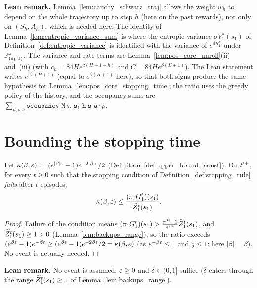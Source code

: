 \textbf{Lean remark.} Lemma~\ref{lem:cauchy_schwarz_traj} allows the weight $w_h$ to depend on
the whole trajectory up to step $h$ (here on the past rewards), not only on $(S_h, A_h)$, which
is needed here. The identity of Lemma~\ref{lem:entropic_variance_sum} is where the entropic
variance $\sigma V^\pi_1(s_1)$ of Definition~\ref{def:entropic_variance} is identified with the
variance of $e^{\beta R_1^\pi}$ under $\mathbb{P}^\pi_{(s_1,1)}$. The variance and rate terms are
Lemma~\ref{lem:pos_core_unroll}(ii) and~(iii) (with $c_h = 84He^{\beta(H+1-h)}$ and
$C = 84He^{\beta(H+1)}$). The Lean statement writes $e^{|\beta|(H+1)}$ (equal to $e^{\beta(H+1)}$ here), so
that both signs produce the same hypothesis for Lemma~\ref{lem:pos_core_stopping_time}; the
ratio uses the greedy policy of the history, and the occupancy sums are
$\sum_{h, s, a}\texttt{occupancy M π s₁ h s a} \cdot \rho$.

\section{Bounding the stopping time}
\label{sec:pos_stopping_time}

\begin{lemma}\label{lem:progress_pos}
\leanok
{}
Let $\kappa(\beta, \varepsilon) := (e^{|\beta|\varepsilon} - 1)e^{-2|\beta|\varepsilon}/2$ (Definition~\ref{def:upper_bound_const}).
On $\mathcal{E}^+$, for every $t \ge 0$ such that the stopping condition of Definition~\ref{def:stopping_rule}
\emph{fails} after $t$ episodes,
\[
  \kappa(\beta, \varepsilon) \le \frac{(\pi_1G_1^t)(s_1)}{\widetilde{Z}_1^t(s_1)} .
\]
\end{lemma}

\begin{proof}
\leanok
Failure of the condition means $(\pi_1G_1^t)(s_1) > \frac{e^{\beta\varepsilon} - 1}{e^{\beta\varepsilon}}\widetilde{Z}_1^t(s_1)$, and
$\widetilde{Z}_1^t(s_1) \ge 1 > 0$ (Lemma~\ref{lem:backups_range}), so the ratio exceeds
$(e^{\beta\varepsilon} - 1)e^{-\beta\varepsilon} \ge (e^{\beta\varepsilon} - 1)e^{-2\beta\varepsilon}/2 = \kappa(\beta,\varepsilon)$ (as $e^{-\beta\varepsilon} \le 1$ and $\frac12 \le 1$;
here $|\beta| = \beta$). No event is actually needed.
\end{proof}

\textbf{Lean remark.} No event is assumed; $\varepsilon \ge 0$ and $\delta \in (0, 1]$ suffice ($\delta$ enters
through the range $\widetilde{Z}_1^t(s_1) \ge 1$ of Lemma~\ref{lem:backups_range}).

